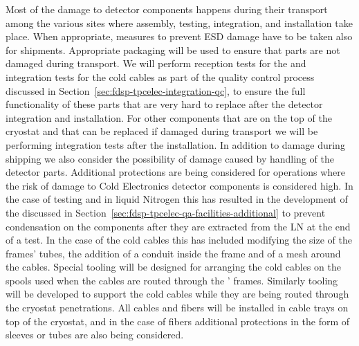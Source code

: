 Most of the damage to detector components happens during their
transport among the various sites where assembly, testing, integration,
and installation take place. When appropriate, measures to prevent
ESD damage have to be taken also for shipments. Appropriate 
packaging will be used to ensure that parts are not damaged
during transport. We will perform reception tests for the 
 and integration tests for the cold cables as
part of the quality control process discussed in 
Section~\ref{sec:fdsp-tpcelec-integration-qc}, to ensure the 
full functionality of these parts that are very hard to replace 
after the detector integration and installation. For other 
components that are on the top of the cryostat and that
can be replaced if damaged during transport we will be
performing integration tests after the installation. 
In addition to damage during shipping we also consider the
possibility of damage caused by handling of the detector parts.
Additional protections are being considered for operations where
the risk of damage to Cold Electronics detector components is
considered high. In the case of testing  and  
in liquid Nitrogen this has resulted in the development of the
 discussed in Section~\ref{sec:fdsp-tpcelec-qa-facilities-additional}
to prevent condensation on the components after they are extracted from
the LN at the end of a test. In the case of the cold cables this 
has included modifying the size of the  frames' tubes, 
the addition of a conduit inside the frame and of a mesh around 
the cables. Special tooling will be designed for arranging the
cold cables on the spools used when the cables are routed through
the ' frames. Similarly tooling will be developed to 
support the cold cables while they are being routed through the 
cryostat penetrations. All cables and fibers will
be installed in cable trays on top of the cryostat, and in the case
of fibers additional protections in the form of sleeves or tubes 
are also being considered. 

